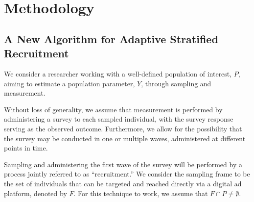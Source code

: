 \documentclass[letterpaper,12pt]{article}
\theoremstyle{proposition}
\begin{document}



\section*{Methodology}
\subsection*{A New Algorithm for Adaptive Stratified Recruitment}




We consider a researcher working with a well-defined population of interest, $P$, aiming to estimate a population parameter, $Y$, through sampling and measurement.

Without loss of generality, we assume that measurement is performed by administering a survey to each sampled individual, with the survey response serving as the observed outcome. Furthermore, we allow for the possibility that the survey may be conducted in one or multiple waves, administered at different points in time.

Sampling and administering the first wave of the survey will be performed by a process jointly referred to as ``recruitment.'' We consider the sampling frame to be the set of individuals that can be targeted and reached directly via a digital ad platform, denoted by \( F \). For this technique to work, we assume that \( F \cap P \neq \emptyset \).
\end{document}
